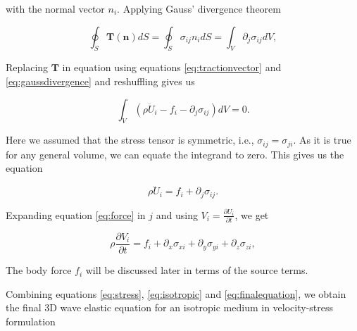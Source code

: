 with the normal vector $n_i$. Applying Gauss' divergence theorem

\begin{equation}
    \oint_S \mathbf{T\left(n\right)}dS = \oint_S \sigma_{ij}n_idS = \int_V \partial_j \sigma_{ij}dV,
\label{eq:gaussdivergence}
\end{equation}

Replacing $\mathbf{T}$ in equation  using equations \ref{eq:tractionvector} and \ref{eq:gaussdivergence} and reshuffling gives us

\begin{equation}
    \int_V \left(\rho \ddot{U}_i - f_i - \partial_j \sigma_{ij}\right)dV = 0.
\end{equation}

Here we assumed that the stress tensor is symmetric, i.e., $\sigma_{ij}=\sigma_{ji}$. As it is true for any general volume, we can
equate the integrand to zero. This gives us the equation

\begin{equation}
    \rho \ddot{U}_i = f_i + \partial_j \sigma_{ij}.
    \label{eq:force}
\end{equation}

Expanding equation \ref{eq:force} in $j$ and using $V_i = \frac{\partial U_i}{\partial t}$, we get

\begin{equation}
    \rho \frac{\partial V_i}{\partial t} = f_i + \partial_x \sigma_{xi} + \partial_y \sigma_{yi} + \partial_z \sigma_{zi},
    \label{eq:finalequation}
\end{equation}

The body force $f_i$ will be discussed later in terms of the source terms.
\par Combining equations \ref{eq:stress}, \ref{eq:isotropic} and \ref{eq:finalequation}, we obtain the final 3D 
wave elastic equation for an isotropic medium in velocity-stress formulation

